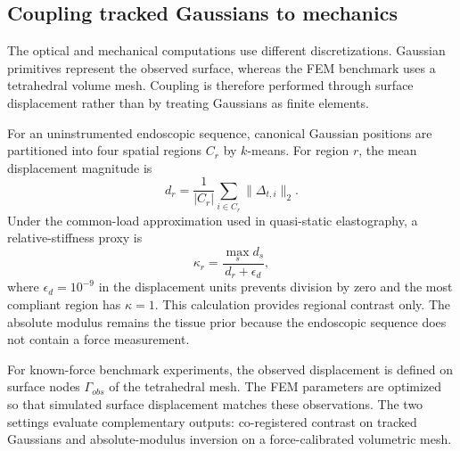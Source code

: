 \documentclass[pdflatex,lineno,referee,sn-vancouver,Numbered]{sn-jnl}
\begin{document}
\subsection{Coupling tracked Gaussians to mechanics}
\label{sec:coupling}
The optical and mechanical computations use different discretizations.
Gaussian primitives represent the observed surface, whereas the FEM
benchmark uses a tetrahedral volume mesh. Coupling is therefore performed
through surface displacement rather than by treating Gaussians as finite
elements.

For an uninstrumented endoscopic sequence, canonical Gaussian positions
are partitioned into four spatial regions $C_r$ by $k$-means. For region $r$,
the mean displacement magnitude is
\begin{equation}
d_r = \frac{1}{|C_r|}\sum_{i\in C_r}\|\Delta_{t,i}\|_2 .
\label{eq:relative_displacement}
\end{equation}
Under the common-load approximation used in quasi-static elastography, a
relative-stiffness proxy is
\begin{equation}
\kappa_r = \frac{\max_s d_s}{d_r+\epsilon_d},
\label{eq:relative_stiffness}
\end{equation}
where $\epsilon_d=10^{-9}$ in the displacement units prevents division by
zero and the most compliant region has $\kappa=1$. This calculation
provides regional contrast only. The
absolute modulus remains the tissue prior because the endoscopic sequence
does not contain a force measurement.

For known-force benchmark experiments, the observed displacement is
defined on surface nodes $\Gamma_{obs}$ of the tetrahedral mesh. The FEM
parameters are optimized so that simulated surface displacement matches
these observations. The two settings evaluate complementary outputs:
co-registered contrast on tracked Gaussians and absolute-modulus inversion
on a force-calibrated volumetric mesh.
\end{document}
